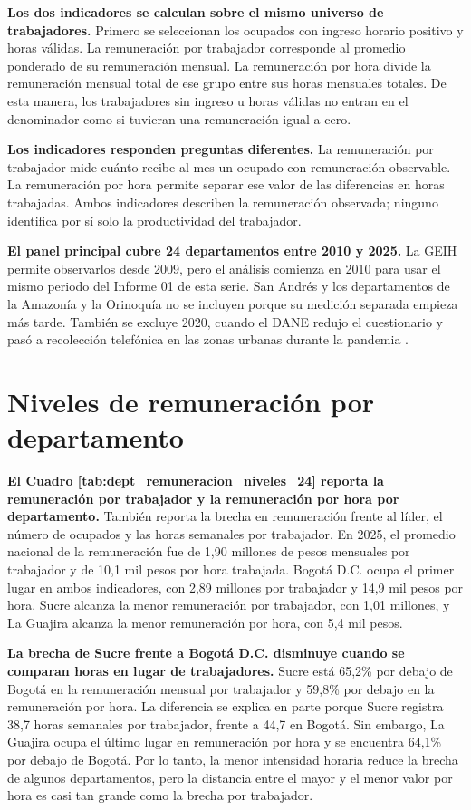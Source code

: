 \textbf{Los dos indicadores se calculan sobre el mismo universo de trabajadores.} Primero se seleccionan los ocupados con ingreso horario positivo y horas válidas. La remuneración por trabajador corresponde al promedio ponderado de su remuneración mensual. La remuneración por hora divide la remuneración mensual total de ese grupo entre sus horas mensuales totales. De esta manera, los trabajadores sin ingreso u horas válidas no entran en el denominador como si tuvieran una remuneración igual a cero.

\textbf{Los indicadores responden preguntas diferentes.} La remuneración por trabajador mide cuánto recibe al mes un ocupado con remuneración observable. La remuneración por hora permite separar ese valor de las diferencias en horas trabajadas. Ambos indicadores describen la remuneración observada; ninguno identifica por sí solo la productividad del trabajador.

\textbf{El panel principal cubre 24 departamentos entre 2010 y 2025.} La GEIH permite observarlos desde 2009, pero el análisis comienza en 2010 para usar el mismo periodo del Informe 01 de esta serie. San Andrés y los departamentos de la Amazonía y la Orinoquía no se incluyen porque su medición separada empieza más tarde. También se excluye 2020, cuando el DANE redujo el cuestionario y pasó a recolección telefónica en las zonas urbanas durante la pandemia \citep{dane2020ajustes}.

\section{Niveles de remuneración por departamento}

\textbf{El Cuadro \ref{tab:dept_remuneracion_niveles_24} reporta la remuneración por trabajador y la remuneración por hora por departamento.} También reporta la brecha en remuneración frente al líder, el número de ocupados y las horas semanales por trabajador. En 2025, el promedio nacional de la remuneración fue de 1,90 millones de pesos mensuales por trabajador y de 10,1 mil pesos por hora trabajada. Bogotá D.C. ocupa el primer lugar en ambos indicadores, con 2,89 millones por trabajador y 14,9 mil pesos por hora. Sucre alcanza la menor remuneración por trabajador, con 1,01 millones, y La Guajira alcanza la menor remuneración por hora, con 5,4 mil pesos.



\textbf{La brecha de Sucre frente a Bogotá D.C. disminuye cuando se comparan horas en lugar de trabajadores.} Sucre está 65,2\% por debajo de Bogotá en la remuneración mensual por trabajador y 59,8\% por debajo en la remuneración por hora. La diferencia se explica en parte porque Sucre registra 38,7 horas semanales por trabajador, frente a 44,7 en Bogotá. Sin embargo, La Guajira ocupa el último lugar en remuneración por hora y se encuentra 64,1\% por debajo de Bogotá. Por lo tanto, la menor intensidad horaria reduce la brecha de algunos departamentos, pero la distancia entre el mayor y el menor valor por hora es casi tan grande como la brecha por trabajador.

